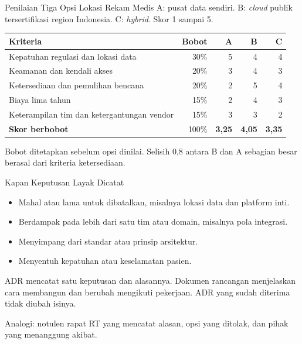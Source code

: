 \documentclass[aspectratio=169, table, 12pt]{beamer}
\begin{document}
\begin{frame}{{\Large Penilaian Tiga Opsi Lokasi Rekam Medis}}
  \small A: pusat data sendiri. B: \textit{cloud} publik tersertifikasi region Indonesia. C:
  \textit{hybrid}. Skor 1 sampai 5.

  \vspace{4pt}
  \footnotesize
  \begin{tabularx}{\textwidth}{Xrrrr}
    \hline
    \textbf{Kriteria} & \textbf{Bobot} & \textbf{A} & \textbf{B} & \textbf{C} \\
    \hline
    Kepatuhan regulasi dan lokasi data & 30\% & 5 & 4 & 4 \\
    \hline
    Keamanan dan kendali akses & 20\% & 3 & 4 & 3 \\
    \hline
    Ketersediaan dan pemulihan bencana & 20\% & 2 & 5 & 4 \\
    \hline
    Biaya lima tahun & 15\% & 2 & 4 & 3 \\
    \hline
    Keterampilan tim dan ketergantungan vendor & 15\% & 3 & 3 & 2 \\
    \hline
    \textbf{Skor berbobot} & 100\% & \textbf{3,25} & \textbf{4,05} & \textbf{3,35} \\
    \hline
  \end{tabularx}

  \vspace{4pt}
  \small Bobot ditetapkan sebelum opsi dinilai. Selisih 0,8 antara B dan A sebagian besar berasal dari
  kriteria ketersediaan.
\end{frame}

\begin{frame}{{\Large Kapan Keputusan Layak Dicatat}}
  \small
  \vspace{6pt}
  \begin{itemize}
    \item Mahal atau lama untuk dibatalkan, misalnya lokasi data dan platform inti.
    \item Berdampak pada lebih dari satu tim atau domain, misalnya pola integrasi.
    \item Menyimpang dari standar atau prinsip arsitektur.
    \item Menyentuh kepatuhan atau keselamatan pasien.
  \end{itemize}
  \vspace{6pt}
  ADR mencatat satu keputusan dan alasannya. Dokumen rancangan menjelaskan cara membangun dan berubah
  mengikuti pekerjaan. ADR yang sudah diterima tidak diubah isinya.

  \vspace{6pt}
  Analogi: notulen rapat RT yang mencatat alasan, opsi yang ditolak, dan pihak yang menanggung akibat.
\end{frame}
\end{document}
